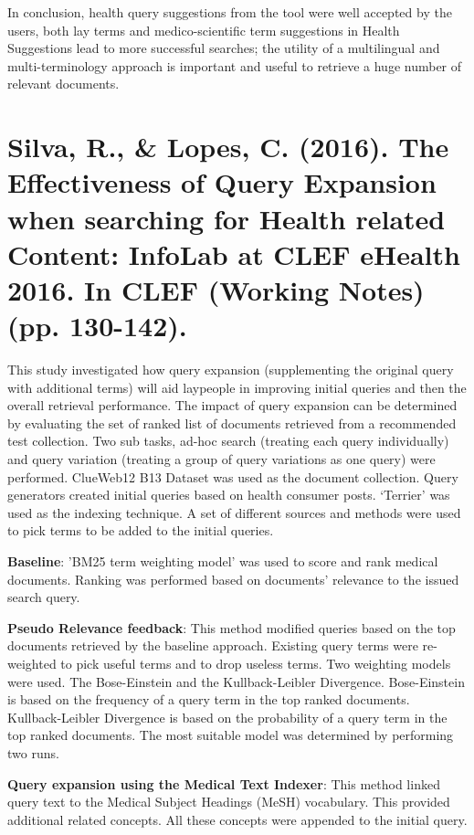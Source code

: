 \documentclass[]{article}
\begin{document}
In conclusion, health query suggestions from the tool were well accepted by the users, both lay terms and medico-scientific term suggestions in Health Suggestions lead to more successful searches; the utility of a multilingual and multi-terminology approach is important and useful to retrieve a huge number of relevant documents.     

\section{Silva, R., \& Lopes, C. (2016). The Effectiveness of Query Expansion when searching for Health related Content: InfoLab at CLEF eHealth 2016. In CLEF (Working Notes) (pp. 130-142).}

This study investigated how query expansion (supplementing the original query with additional terms) will aid laypeople in improving initial queries and then the overall retrieval performance. The impact of query expansion can be determined by evaluating the set of ranked list of documents retrieved from a recommended test collection. Two sub tasks, ad-hoc search (treating each query individually) and query variation (treating a group of query variations as one query) were performed. ClueWeb12 B13 Dataset was used as the document collection. Query generators created initial queries based on health consumer posts. ‘Terrier’ was used as the indexing technique. A set of different sources and methods were used to pick terms to be added to the initial queries.        

\textbf{Baseline}: 'BM25 term weighting model' was used to score and rank medical documents. Ranking was performed based on documents' relevance to the issued search query. 

\textbf{Pseudo Relevance feedback}: This method modified queries based on the top documents retrieved by the baseline approach. Existing query terms were re-weighted to pick useful terms and to drop useless terms. Two weighting models were used. The Bose-Einstein and the Kullback-Leibler Divergence. Bose-Einstein is based on the frequency of a query term in the top ranked documents. Kullback-Leibler Divergence is based on the probability of a query term in the top ranked documents. The most suitable model was determined by performing two runs.             

\textbf{Query expansion using the Medical Text Indexer}: This method linked query text to the Medical Subject Headings (MeSH) vocabulary. This provided additional related concepts. All these concepts were appended to the initial query.  
\end{document}
